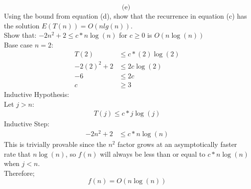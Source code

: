 \documentclass{article}
\begin{document}
\begin{enumerate}
\newpage
\[
\text{(e) }
\]
Using the bound from equation (d), show that the recurrence in equation (c) has the solution $E(T(n)) = O(n lg(n))$. \\
\newline 
Show that: $-2n^{2} + 2 \leq c * n\log(n)$ for $c \geq 0$ is $O(n\log(n))$ \\
Base case $n=2$: \\
\begin{align*}
    T(2) & \leq c* (2) \log(2) \\
    -2(2)^{2} + 2 & \leq 2c \log(2) \\
    -6 & \leq 2c \\
    c & \geq 3
\end{align*}
Inductive Hypothesis: \\
Let $j > n$: \\
\begin{align*}
    T(j) \leq c * j \log(j)
\end{align*}
Inductive Step: \\
\begin{align*}
    -2n^{2} +2 & \leq c * n\log(n)
\end{align*}
This is trivially provable since the $n^2$ factor grows at an asymptotically faster rate that $n\log(n)$, so $f(n)$ will always be less than or equal to $c*n\log(n)$ when $j < n$. \\
Therefore;
\[
\boxed{f(n) = O(n\log(n))}
\]
\newpage 








\end{enumerate}
\end{document}
